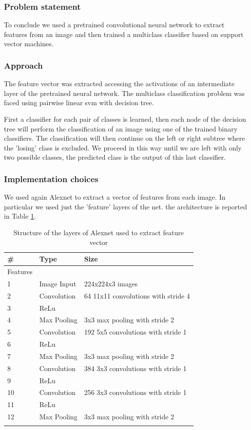 \documentclass[12pt, a4paper]{report}
\begin{document}
\subsubsection*{Problem statement}
To conclude we used a pretrained convolutional neural network to extract features from an image and then trained a multiclass classifier based on support vector machines.

\subsubsection*{Approach}

The feature vector was extracted accessing the activations of an intermediate layer of the pretrained neural network. The multiclass classification problem was faced using pairwise linear svm with decision tree. 

First a classifier for each pair of classes is learned, then each node of the decision tree will perform the classification of an image using one of the trained binary classifiers. The classification will then continue on the left or right subtree where the 'losing' class is excluded. We proceed in this way until we are left with only two possible classes, the predicted class is the output of this last classifier.

\subsubsection*{Implementation choices}

We used again Alexnet to extract a vector of features from each image. In particular we used just the 'feature' layers of the net. the architecture is reported in Table \ref{tab:SVM}.

\begin{table}[h!]
	\centering
	\caption{Structure of the layers of Alexnet used to extract feature vector}
	\begin{tabular}{lll}
		\# & Type & Size \\
		\midrule
		Features & & \\
		1 & Image Input & 224x224x3 images \\
		2 & Convolution & 64 11x11 convolutions with stride 4 \\
		3 & ReLu & \\
		4 & Max Pooling & 3x3 max pooling with stride 2 \\
		5 & Convolution & 192 5x5 convolutions with stride 1 \\
		6 & ReLu & \\
		7 & Max Pooling & 3x3 max pooling with stride 2 \\
		8 & Convolution & 384 3x3 convolutions with stride 1 \\
		9 & ReLu & \\
		10 & Convolution & 256 3x3 convolutions with stride 1 \\
		11 & ReLu & \\
		12 & Max Pooling & 3x3 max pooling with stride 2 \\
		\bottomrule
		\label{tab:SVM}
	\end{tabular}
\end{table}
\end{document}
